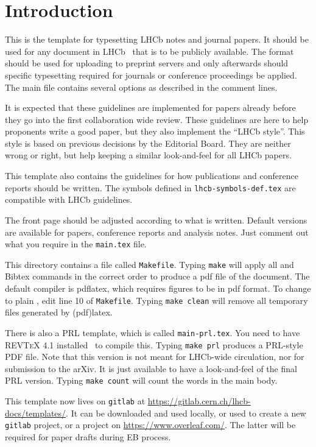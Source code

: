 \section{Introduction}
\label{sec:Introduction}
 
This is the template for typesetting LHCb notes and journal papers.
It should be used for any document in LHCb~\cite{LHCb-DP-2008-001} that is to be
publicly available. The format should be used for uploading to
preprint servers and only afterwards should specific typesetting
required for journals or conference proceedings be applied. The main
\latex file contains several options as described in the \latex comment
lines.
 
It is expected that these guidelines are implemented for papers already
before they go into the first collaboration wide review.
These guidelines are here to help proponents write a good paper,
but they also implement the ``LHCb style''. This style is based on
previous decisions by the Editorial Board. They are neither wrong or right,
but help keeping a similar look-and-feel for all LHCb papers.

This template also contains the guidelines for how publications and
conference reports should be written.
The symbols defined in \texttt{lhcb-symbols-def.tex} are compatible with
LHCb guidelines.
 
The front page should be adjusted according to what is
written. Default versions are available for papers, conference reports
and analysis notes. Just comment out what you require in the
\texttt{main.tex} file.
 
This directory contains a file called \texttt{Makefile}.
Typing \texttt{make} will apply all \latex and Bibtex commands
in the correct order to produce a pdf file of the document.
The default \latex compiler is pdflatex, which requires figures
to be in pdf format.
To change to plain \latex, edit line 10 of \texttt{Makefile}.
Typing \texttt{make clean} will remove all temporary files generated by (pdf)latex.
 
There is also a PRL template, which is called \texttt{main-prl.tex}.  You need
to have \textsc{REVTeX 4.1} installed~\cite{REVTeX} to compile this. Typing
\texttt{make prl} produces a PRL-style PDF file. Note that this version is not
meant for LHCb-wide circulation, nor for submission to the arXiv. It is just
available to have a look-and-feel of the final PRL version. Typing \texttt{make
 count} will count the words in the main body.
 
This template now lives on {\tt gitlab} at \url{https://gitlab.cern.ch/lhcb-docs/templates/}. It can be downloaded and used locally, or used to create a new {\tt gitlab} project, or a project on \url{https://www.overleaf.com/}. The latter will be required for paper drafts during EB process.

